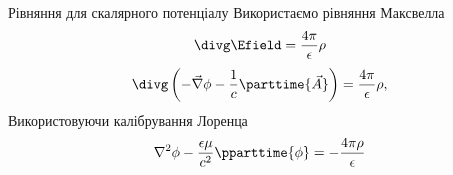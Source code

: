 \documentclass[onlytextwidth]{beamer}
\let\vect\vec
\begin{document}
\begin{frame}{Рівняння для скалярного потенціалу}{}
	Використаємо рівняння Максвелла
	\begin{equation*}
		\divg\Efield = \frac{4\pi}{\epsilon} \rho
	\end{equation*}
	\begin{equation*}
		\divg \left( -\vect{\nabla}\phi - \frac1c\parttime{\vect{A}} \right) = \frac{4\pi}{\epsilon} \rho,
	\end{equation*}
	Використовуючи калібрування Лоренца
	\begin{equation*}
		\nabla^2\phi - \frac{ \epsilon\mu }{c^2} \pparttime{\phi} = - \frac{4\pi\rho}{\epsilon}
	\end{equation*}
\end{frame}
\end{document}

